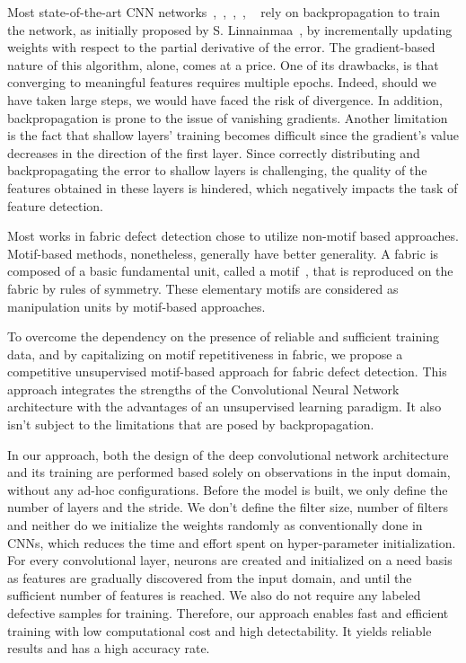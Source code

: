 \documentclass[3p,,preprint,review,12pt]{elsarticle}
\begin{document}
Most state-of-the-art CNN networks\unskip~\cite{981091:21201220},\unskip~\cite{981091:21201221},\unskip~\cite{981091:21201181},\unskip~\cite{981091:21201173}, \unskip~\cite{981091:21201172} rely on backpropagation to train the network, as initially proposed by S. Linnainmaa\unskip~\cite{981091:21231864}, by incrementally updating weights with respect to the partial derivative of the error. The gradient-based nature of this algorithm, alone, comes at a price. One of its drawbacks, is that converging to meaningful features requires multiple epochs. Indeed, should we have taken large steps, we would have faced the risk of divergence. In addition, backpropagation is prone to the issue of vanishing gradients. Another limitation is the fact that shallow layers' training becomes difficult since the gradient's value decreases in the direction of the first layer. Since correctly distributing and backpropagating the error to shallow layers is challenging, the quality of the features obtained in these layers is hindered, which negatively impacts the task of feature detection.  

Most works in fabric defect detection chose to utilize non-motif based approaches. Motif-based methods, nonetheless, generally have better generality. A fabric is composed of a basic fundamental unit, called a motif\unskip~\cite{981091:21231851}, that is reproduced on the fabric by rules of symmetry. These elementary motifs are considered as manipulation units by motif-based approaches.

To overcome the dependency on the presence of reliable and sufficient training data, and by capitalizing on motif repetitiveness in fabric, we propose a competitive unsupervised motif-based approach for fabric defect detection. This approach integrates the strengths of the Convolutional Neural Network architecture with the advantages of an unsupervised learning paradigm. It also isn't subject to the limitations that are posed by backpropagation.

In our approach, both the design of the deep convolutional network architecture and its training are performed based solely on observations in the input domain, without any ad-hoc configurations. Before the model is built, we only define the number of layers and the stride. We don't define the filter size, number of filters and neither do we initialize the weights randomly as conventionally done in CNNs, which reduces the time and effort spent on hyper-parameter initialization. For every convolutional layer, neurons are created and initialized on a need basis as features are gradually discovered from the input domain, and until the sufficient number of features is reached. We also do not require any labeled defective samples for training. Therefore, our approach enables fast and efficient training with low computational cost and high detectability. It yields reliable results and has a high accuracy rate.
\end{document}
